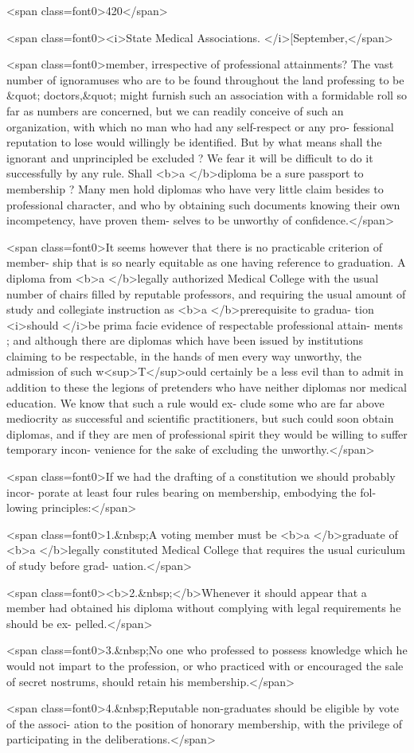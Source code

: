 <span class=font0>420</span>

<span class=font0><i>State Medical Associations. </i>[September,</span>

<span class=font0>member, irrespective of professional attainments? The vast number
of ignoramuses who are to be found throughout the land professing to
be &quot; doctors,&quot; might furnish such an association with a formidable roll
so far as numbers are concerned, but we can readily conceive of such
an organization, with which no man who had any self-respect or any pro-
fessional reputation to lose would willingly be identified. But by what
means shall the ignorant and unprincipled be excluded ? We fear it
will be difficult to do it successfully by any rule. Shall <b>a </b>diploma be
a sure passport to membership ? Many men hold diplomas who have
very little claim besides to professional character, and who by obtaining
such documents knowing their own incompetency, have proven them-
selves to be unworthy of confidence.</span>

<span class=font0>It seems however that there is no practicable criterion of member-
ship that is so nearly equitable as one having reference to graduation.
A diploma from <b>a </b>legally authorized Medical College with the usual
number of chairs filled by reputable professors, and requiring the usual
amount of study and collegiate instruction as <b>a </b>prerequisite to gradua-
tion <i>should </i>be prima facie evidence of respectable professional attain-
ments ; and although there are diplomas which have been issued by
institutions claiming to be respectable, in the hands of men every way
unworthy, the admission of such w<sup>T</sup>ould certainly be a less evil than to
admit in addition to these the legions of pretenders who have neither
diplomas nor medical education. We know that such a rule would ex-
clude some who are far above mediocrity as successful and scientific
practitioners, but such could soon obtain diplomas, and if they are men
of professional spirit they would be willing to suffer temporary incon-
venience for the sake of excluding the unworthy.</span>

<span class=font0>If we had the drafting of a constitution we should probably incor-
porate at least four rules bearing on membership, embodying the fol-
lowing principles:</span>

<span class=font0>1.&nbsp;A voting member must be <b>a </b>graduate of <b>a </b>legally constituted
Medical College that requires the usual curiculum of study before grad-
uation.</span>

<span class=font0><b>2.&nbsp;</b>Whenever it should appear that a member had obtained his
diploma without complying with legal requirements he should be ex-
pelled.</span>

<span class=font0>3.&nbsp;No one who professed to possess knowledge which he would not
impart to the profession, or who practiced with or encouraged the sale of
secret nostrums, should retain his membership.</span>

<span class=font0>4.&nbsp;Reputable non-graduates should be eligible by vote of the associ-
ation to the position of honorary membership, with the privilege of
participating in the deliberations.</span>
